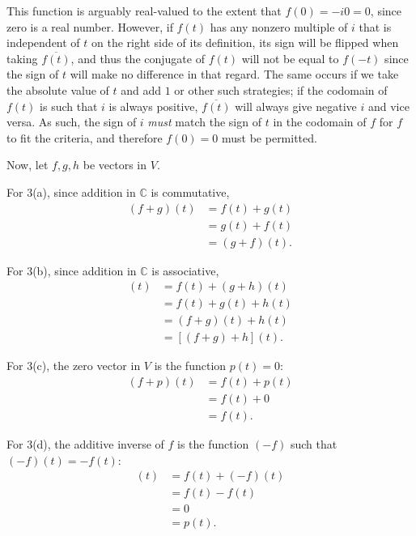 \documentclass[12pt]{article}
\begin{document}
\begin{enumerate}
    This function is arguably real-valued to the extent that $f(0) = -i0 = 0$, since
    zero is a real number. However, if $f(t)$ has any nonzero multiple of $i$ that is
    independent of $t$ on the right side of its definition, its sign will be flipped
    when taking $\overline{f(t)}$, and thus the conjugate of $f(t)$ will not be equal
    to $f(-t)$ since the sign of $t$ will make no difference in that regard. The same
    occurs if we take the absolute value of $t$ and add $1$ or other such strategies;
    if the codomain of $f(t)$ is such that $i$ is always positive, $\overline{f(t)}$
    will always give negative $i$ and vice versa. As such, the sign of $i$
    \textit{must} match the sign of $t$ in the codomain of $f$ for $f$ to fit the
    criteria, and therefore $f(0) = 0$ must be permitted.

    Now, let $f,g,h$ be vectors in $V$.

    For 3(a), since addition in $\mathbb{C}$ is commutative,
    \begin{align*}
      (f + g)(t) &= f(t) + g(t)\\
                 &= g(t) + f(t)\\
                 &= (g + f)(t).
    \end{align*}

    For 3(b), since addition in $\mathbb{C}$ is associative,
    \begin{align*}
      [f + (g + h)](t) &= f(t) + (g + h)(t)\\
                       &= f(t) + g(t) + h(t)\\
                       &= (f + g)(t) + h(t)\\
                       &= [(f + g) + h](t).
    \end{align*}

    For 3(c), the zero vector in $V$ is the function $p(t) = 0$:
    \begin{align*}
      (f + p)(t) &= f(t) + p(t)\\
                 &= f(t) + 0\\
                 &= f(t).
    \end{align*}

    For 3(d), the additive inverse of $f$ is the function $(-f)$ such that $(-f)(t) =
    -f(t)$:
    \begin{align*}
      [f + (-f)](t) &= f(t) + (-f)(t)\\
                    &= f(t) - f(t)\\
                    &= 0\\
                    &= p(t).
    \end{align*}


\end{enumerate}
\end{document}
